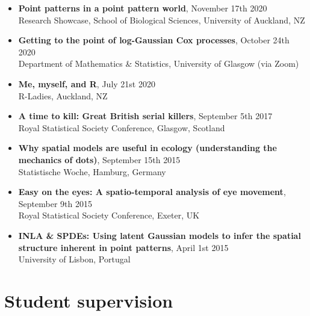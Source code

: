 \documentclass[10pt,a4paper]{moderncv}
\begin{document}
\begin{itemize}
    \item \textbf{Point patterns in a point pattern world}, November 17th 2020\\
    { Research Showcase, School of Biological Sciences, University of Auckland, NZ}
    
    \item \textbf{Getting to the point of log-Gaussian Cox processes}, October 24th 2020\\
    { Department of Mathematics \& Statistics, University of Glasgow (via Zoom)}
    
    \item \textbf{Me, myself, and R}, July 21st 2020\\
    { R-Ladies, Auckland, NZ}
    
    \item \textbf{A time to kill: Great British serial killers}, September 5th 2017\\
    { Royal Statistical Society Conference, Glasgow, Scotland}
    
    \item \textbf{Why spatial models are useful in ecology (understanding the mechanics of dots)}, September 15th 2015\\
    { Statistische Woche, Hamburg, Germany}
    
    \item \textbf{Easy on the eyes: A spatio-temporal analysis of eye movement}, September 9th 2015\\
    { Royal Statistical Society Conference, Exeter, UK}
    
    \item \textbf{INLA \& SPDEs: Using latent Gaussian models to infer the spatial structure inherent in point patterns}, April 1st 2015\\
    { University of Lisbon, Portugal}
    
\end{itemize}


\section{Student supervision}

\vspace{6pt}
\end{document}
